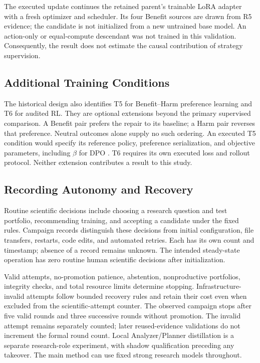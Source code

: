 The executed update continues the retained parent's trainable LoRA
adapter with a fresh optimizer and scheduler. Its four Benefit sources
are drawn from R5 evidence; the candidate is not initialized from a new
untrained base model. An action-only or equal-compute descendant was not
trained in this validation. Consequently, the result does not estimate
the causal contribution of strategy supervision.

\subsection{Additional Training Conditions}
\label{app:optional}
The historical design also identifies T5 for Benefit--Harm preference
learning and T6 for audited RL. They are optional extensions beyond the
primary supervised comparison. A Benefit pair prefers the repair to its
baseline; a Harm pair reverses that preference. Neutral outcomes alone
supply no such ordering. An executed T5 condition would specify its reference
policy, preference serialization, and objective parameters, including
$\beta$ for DPO \citep{rafailov2023dpo}. T6 requires its own executed loss
and rollout protocol. Neither extension contributes a result to this study.

\subsection{Recording Autonomy and Recovery}
Routine scientific decisions include choosing a research question and test
portfolio, recommending training, and accepting a candidate under the fixed
rules. Campaign records distinguish these decisions from initial
configuration, file transfers, restarts, code edits, and automated retries.
Each has its own count and timestamp; absence of a record remains unknown.
The intended steady-state operation has zero routine human scientific
decisions after initialization.

Valid attempts, no-promotion patience, abstention, nonproductive portfolios,
integrity checks, and total resource limits determine stopping.
Infrastructure-invalid attempts follow bounded recovery rules and retain
their cost even when excluded from the scientific-attempt counter.
The observed campaign stops after five valid rounds and three successive
rounds without promotion. The invalid attempt remains separately counted;
later reused-evidence validations do not increment the formal round count.
Local Analyzer/Planner distillation is a separate research-role experiment,
with shadow qualification preceding any takeover. The main method can use
fixed strong research models throughout.
